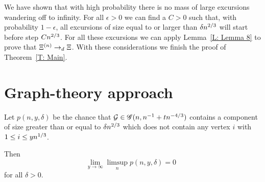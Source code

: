 We have shown that with high probability there is no mass of large excursions wandering off to infinity.
For all $\epsilon>0$ we can find a $C>0$ such that,
with probability $1-\epsilon$,
all excursions of size equal to or larger than $\delta n^{2 / 3}$ will start before step $Cn^{2 / 3}$.
For all these excursions we can apply Lemma~\ref{L: Lemma 8} to prove that $\Xi^{(n)} \rightarrow_d \Xi$.
With these considerations we finish the proof of Theorem~\ref{T: Main}.

\section{Graph-theory approach}



\begin{lemma} \label{L: Lemma 9}
	Let $p(n, y, \delta)$ be the chance that $\mathcal{G} \in \mathscr{G}(n, n^{-1} + tn^{-4/3})$
	contains a component of size greater than or equal to $\delta n^{2 / 3}$
	which does not contain any vertex $i$ with $1 \leq i \leq yn^{1 / 3}$.
	
	Then
	\begin{equation}
	\lim_{y \rightarrow \infty} \limsup_n p(n, y, \delta) = 0 \enspace
	\end{equation}
	for all $\delta > 0$.
\end{lemma}

